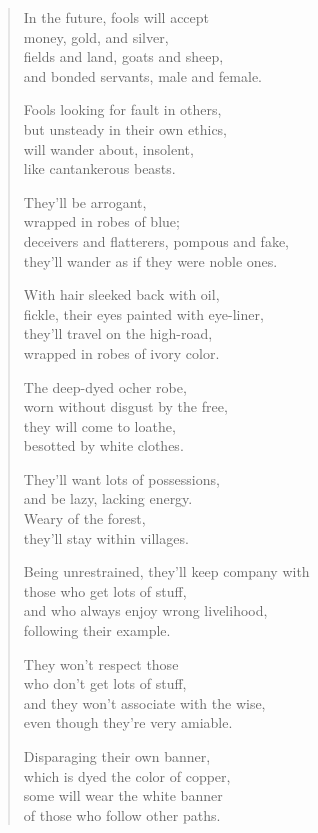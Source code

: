 \documentclass[12pt,openany]{book}%
\begin{document}
\begin{verse}
In the future, fools will accept \\
money, gold, and silver, \\
fields and land, goats and sheep, \\
and bonded servants, male and female. 

Fools looking for fault in others, \\
but unsteady in their own ethics, \\
will wander about, insolent, \\
like cantankerous beasts. 

They’ll be arrogant, \\
wrapped in robes of blue; \\
deceivers and flatterers, pompous and fake, \\
they’ll wander as if they were noble ones. 

With hair sleeked back with oil, \\
fickle, their eyes painted with eye-liner, \\
they’ll travel on the high-road, \\
wrapped in robes of ivory color. 

The deep-dyed ocher robe, \\
worn without disgust by the free, \\
they will come to loathe, \\
besotted by white clothes. 

They’ll want lots of possessions, \\
and be lazy, lacking energy. \\
Weary of the forest, \\
they’ll stay within villages. 

Being unrestrained, they’ll keep company with \\
those who get lots of stuff, \\
and who always enjoy wrong livelihood, \\
following their example. 

They won’t respect those \\
who don’t get lots of stuff, \\
and they won’t associate with the wise, \\
even though they’re very amiable. 

Disparaging their own banner, \\
which is dyed the color of copper, \\
some will wear the white banner \\
of those who follow other paths. 


\end{verse}
\end{document}
